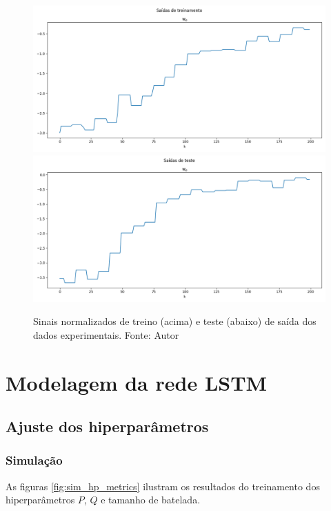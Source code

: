 \begin{figure}[hbt!]
    \centering
    \includegraphics[width=0.8\linewidth]{Imagens/chap04/experiment_outputs_train.png}
    \hfill
    \includegraphics[width=0.8\linewidth]{Imagens/chap04/experiment_outputs_test.png}
    \caption{Sinais normalizados de treino (acima) e teste (abaixo) de saída dos dados experimentais. Fonte: Autor}
    \label{fig:exp_outputs}
\end{figure}

\section{Modelagem da rede LSTM}
\subsection{Ajuste dos hiperparâmetros}
\subsubsection{Simulação}
As figuras \ref{fig:sim_hp_metrics} ilustram os resultados do treinamento dos hiperparâmetros $P$, $Q$ e tamanho de batelada.

